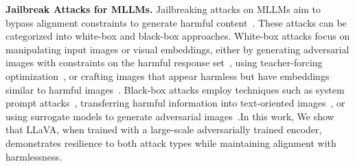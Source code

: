 \noindent \textbf{Jailbreak Attacks for MLLMs.} Jailbreaking attacks on MLLMs aim to bypass alignment constraints to generate harmful content~\cite{jin2024jailbreakzoo,qi2024visual,hossain2024securing,niu2024jailbreaking}. These attacks can be categorized into white-box and black-box approaches. White-box attacks focus on manipulating input images or visual embeddings, either by generating adversarial images with constraints on the harmful response set~\cite{dong2023robust,schlarmann2023adversarial}, using teacher-forcing optimization~\cite{carlini2024aligned}, or crafting images that appear harmless but have embeddings similar to harmful images~\cite{shayegani2023jailbreak}. Black-box attacks employ techniques such as system prompt attacks~\cite{wu2023jailbreaking}, transferring harmful information into text-oriented images~\cite{gong2023figstep}, or using surrogate models to generate adversarial images~\cite{zhao2024evaluating}.In this work, We show that LLaVA, when trained with a large-scale adversarially trained encoder, demonstrates resilience to both attack types while maintaining alignment with harmlessness.